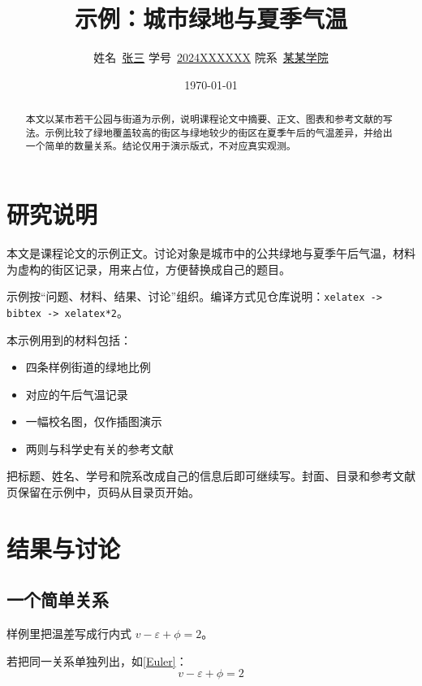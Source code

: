 \documentclass[12pt,hyperref,a4paper,UTF8]{ctexart}
\title{\Huge\textbf{示例：城市绿地与夏季气温}}
\author{%
\kaishu\Large
    姓名\ \underline{张三} \qquad
    学号\ \underline{2024XXXXXX} \qquad
    院系\ \underline{某某学院}%
}
\date{\today}
\begin{document}
\cover

\begin{abstract}
本文以某市若干公园与街道为示例，说明课程论文中摘要、正文、图表和参考文献的写法。示例比较了绿地覆盖较高的街区与绿地较少的街区在夏季午后的气温差异，并给出一个简单的数量关系。结论仅用于演示版式，不对应真实观测。
\end{abstract}

\thispagestyle{empty} %

\newpage
\tableofcontents

\newpage


\section{研究说明}
本文是课程论文的示例正文。讨论对象是城市中的公共绿地与夏季午后气温，材料为虚构的街区记录，用来占位，方便替换成自己的题目。

示例按“问题、材料、结果、讨论”组织。编译方式见仓库说明：\verb|xelatex -> bibtex -> xelatex*2|。

本示例用到的材料包括：
\begin{itemize}
    \item 四条样例街道的绿地比例
    \item 对应的午后气温记录
    \item 一幅校名图，仅作插图演示
    \item 两则与科学史有关的参考文献
\end{itemize}

把标题、姓名、学号和院系改成自己的信息后即可继续写。封面、目录和参考文献页保留在示例中，页码从目录页开始。

\section{结果与讨论}
\subsection{一个简单关系}
样例里把温差写成行内式 $v-\varepsilon+\phi=2$。

若把同一关系单独列出，如\autoref{Euler}：
\begin{equation}
    v-\varepsilon+\phi=2
    \label{Euler}
\end{equation}
\end{document}
